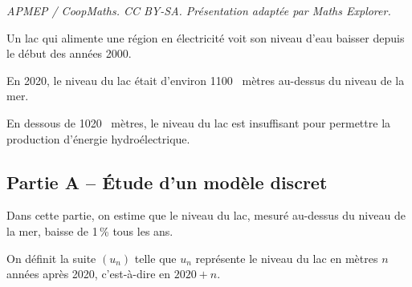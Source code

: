 \documentclass[10pt]{article}
\providecommand{\np}[2][]{{#2~#1}}
\begin{document}
\noindent\textit{APMEP / CoopMaths. CC BY-SA. Présentation adaptée par Maths Explorer.}\par\medskip
Un lac qui alimente une région en électricité voit son niveau d'eau baisser depuis le début des années 2000.

	En 2020, le niveau du lac était d'environ \np{1100} mètres au-dessus du niveau de la mer.

	En dessous de \np{1020} mètres, le niveau du lac est insuffisant pour permettre la production d'énergie hydroélectrique.

	\subsection*{Partie A -- Étude d'un modèle discret}

	Dans cette partie, on estime que le niveau du lac, mesuré au-dessus du niveau de la mer, baisse de 1\,\% tous les ans.

	On définit la suite $(u_n)$ telle que $u_n$ représente le niveau du lac en mètres $n$ années après 2020, c'est-à-dire en $2020+n$.
\end{document}
